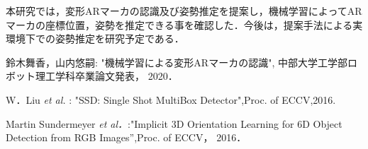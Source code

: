 \documentclass{jsarticle}
\begin{document}





本研究では，変形ARマーカの認識及び姿勢推定を提案し，機械学習によってARマーカの座標位置，姿勢を推定できる事を確認した．今後は，提案手法による実環境下での姿勢推定を研究予定である．

%
%
%

\begin{thebibliography}{1}

{\scriptsize
{}
鈴木舞香，山内悠嗣: "機械学習による変形ARマーカの認識", 中部大学工学部ロボット理工学科卒業論文発表， 2020． }

{\scriptsize
{}
W．Liu {\em et al. }: "SSD: Single Shot MultiBox Detector",Proc. of ECCV,2016.}

{\scriptsize 
{}
Martin Sundermeyer {\em et al．}:"Implicit 3D Orientation Learning for 6D Object Detection from RGB Images'',Proc. of ECCV， 2016．}

\end{thebibliography}
\end{document}
